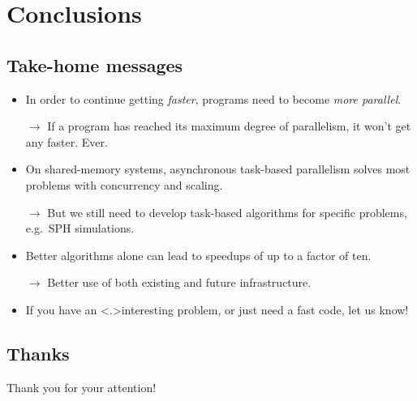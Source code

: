 \documentclass{beamer}
\begin{document}
    
    \section{Conclusions}
    \subsection{Take-home messages}
    
    \begin{frame}
        \begin{itemize}
        
            \item<+-> In order to continue getting {\em faster}, programs
                need to become {\em more parallel}.
                
                
                $\longrightarrow$
                    If a program has reached its maximum degree of parallelism,
                    it won't get any faster. Ever.
                
                \vspace{0.5ex}
                
            \item On shared-memory systems,
                asynchronous task-based parallelism solves most
                problems with concurrency and scaling.
                    
                
                $\longrightarrow$
                    But we still need to develop task-based algorithms
                    for specific problems, e.g.~SPH simulations.
                
                \vspace{0.5ex}
                
            \item Better algorithms alone can lead to speedups
                of up to a factor of ten.
                
                
                $\longrightarrow$
                    Better use of both existing and future
                    infrastructure.
                    
            \item<+-> If you have an \alert<.>{interesting problem}, or
                just need a \alert<+>{fast code}, let us know!
                    
        \end{itemize}
    \end{frame}
        
    
    \subsection{Thanks}
    
    \begin{frame}
        \centerline{Thank you for your attention!}
    \end{frame}
\end{document}
